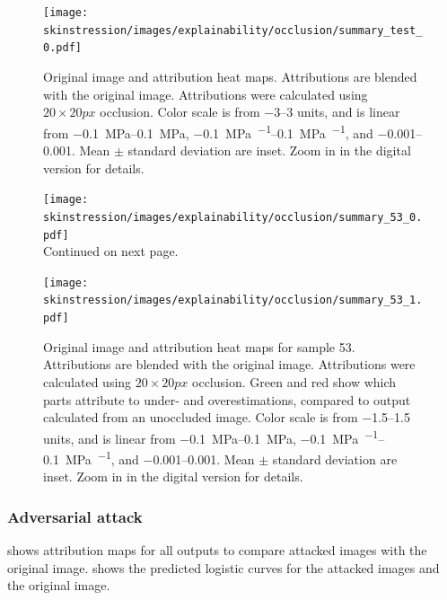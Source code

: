 \begin{figure}
    \centering
    \texttt{[image: skinstression/images/explainability/occlusion/summary\_test\_0.pdf]}
    \caption[Original image and attribution heat maps]{
        Original image and attribution heat maps.
        Attributions are blended with the original image.
        Attributions were calculated using $20\times 20\unit{px}$ occlusion.
        Color scale is from \numrange{-3}{3} units, and is linear from \qtyrange{-0.1}{0.1}{\mega\pascal}, \qtyrange{-0.1}{0.1}{\mega\pascal\per\stretch}, and \qtyrange{-0.001}{0.001}{\stretch}.
        Mean $\pm$ standard deviation are inset.
        Zoom in in the digital version for details.
    }
    \label{fig:skin_occlusion}
\end{figure}


\begin{figure}
    \ContinuedFloat
    \centering
    \texttt{[image: skinstression/images/explainability/occlusion/summary\_53\_0.pdf]} \\
    \raggedleft Continued on next page.
\end{figure}
\begin{figure}
    \centering
    \texttt{[image: skinstression/images/explainability/occlusion/summary\_53\_1.pdf]}
    \caption[Original image and attribution heat maps for sample 53]{
        Original image and attribution heat maps for sample 53.
        Attributions are blended with the original image.
        Attributions were calculated using $20\times 20\unit{px}$ occlusion.
        Green and red show which parts attribute to under- and overestimations, compared to output calculated from an unoccluded image.
        Color scale is from \numrange{-1.5}{1.5} units, and is linear from \qtyrange{-0.1}{0.1}{\mega\pascal}, \qtyrange{-0.1}{0.1}{\mega\pascal\per\stretch}, and \qtyrange{-0.001}{0.001}{\stretch}.
        Mean $\pm$ standard deviation are inset.
        Zoom in in the digital version for details.
    }
    \label{fig:skin_occlusion_53}
\end{figure}

\subsubsection{Adversarial attack}
 shows attribution maps for all outputs to compare attacked images with the original image.
 shows the predicted logistic curves for the attacked images and the original image.


